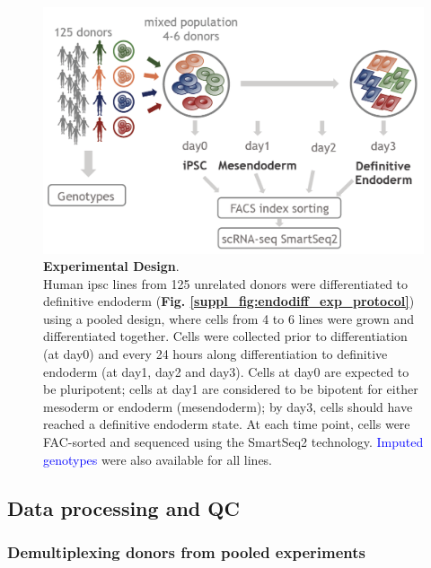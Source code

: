 \begin{figure}[h]
\centering
\includegraphics[width=12cm]{Chapter4/Fig/endodiff_experimental_design.png}
\caption[Experimental Design]{\textbf{Experimental Design}.\\
Human \gls{ipsc} lines from 125 unrelated donors were differentiated to definitive endoderm (\textbf{Fig. \ref{suppl_fig:endodiff_exp_protocol}}) using a pooled design, where cells from 4 to 6 lines were grown and differentiated together.
Cells were collected prior to differentiation (at day0) and every 24 hours along differentiation to definitive endoderm (at day1, day2 and day3).
Cells at day0 are expected to be pluripotent; cells at day1 are considered to be bipotent for either mesoderm or endoderm (mesendoderm); by day3, cells should have reached a definitive endoderm state.
At each time point, cells were FAC-sorted and sequenced using the SmartSeq2 technology.
\textcolor{blue}{Imputed genotypes} were also available for all lines.}
\label{fig:endodiff_experimental_design}
\end{figure}


\subsection{Data processing and QC}
 

\subsubsection{Demultiplexing donors from pooled experiments} 

